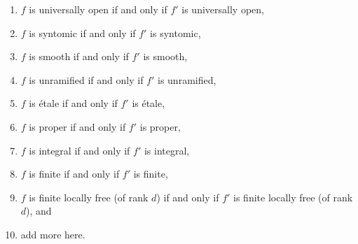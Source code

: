 \begin{lemma}
\begin{enumerate}
\item $f$ is universally open if and only if $f'$ is universally open,
\label{item-universally-open}
\item $f$ is syntomic if and only if $f'$ is syntomic,
\label{item-syntomic}
\item $f$ is smooth if and only if $f'$ is smooth,
\label{item-smooth}
\item $f$ is unramified if and only if $f'$ is unramified,
\label{item-unramified}
\item $f$ is \'etale if and only if $f'$ is \'etale,
\label{item-etale}
\item $f$ is proper if and only if $f'$ is proper,
\label{item-proper}
\item $f$ is integral if and only if $f'$ is integral,
\label{item-integral}
\item $f$ is finite if and only if $f'$ is finite,
\label{item-finite}
\item
\label{item-finite-locally-free}
$f$ is finite locally free (of rank $d$) if and only if $f'$
is finite locally free (of rank $d$), and
\item add more here.
\end{enumerate}
\end{lemma}

